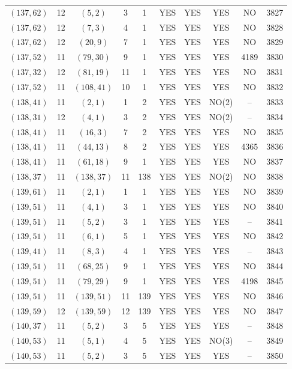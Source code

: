 \begin{longtable}{|c|c|c|c|c|c|c|c|c|c|}
$(137, 62)$ & 12 & $(5, 2)$ & 3 & 1 & YES & YES & YES & NO & 3827\\
$(137, 62)$ & 12 & $(7, 3)$ & 4 & 1 & YES & YES & YES & NO & 3828\\
$(137, 62)$ & 12 & $(20, 9)$ & 7 & 1 & YES & YES & YES & NO & 3829\\
$(137, 52)$ & 11 & $(79, 30)$ & 9 & 1 & YES & YES & YES & 4189 & 3830\\
$(137, 32)$ & 12 & $(81, 19)$ & 11 & 1 & YES & YES & YES & NO & 3831\\
$(137, 52)$ & 11 & $(108, 41)$ & 10 & 1 & YES & YES & YES & NO & 3832\\
$(138, 41)$ & 11 & $(2, 1)$ & 1 & 2 & YES & YES & NO(2) & -- & 3833\\
$(138, 31)$ & 12 & $(4, 1)$ & 3 & 2 & YES & YES & NO(2) & -- & 3834\\
$(138, 41)$ & 11 & $(16, 3)$ & 7 & 2 & YES & YES & YES & NO & 3835\\
$(138, 41)$ & 11 & $(44, 13)$ & 8 & 2 & YES & YES & YES & 4365 & 3836\\
$(138, 41)$ & 11 & $(61, 18)$ & 9 & 1 & YES & YES & YES & NO & 3837\\
$(138, 37)$ & 11 & $(138, 37)$ & 11 & 138 & YES & YES & NO(2) & NO & 3838\\
$(139, 61)$ & 11 & $(2, 1)$ & 1 & 1 & YES & YES & YES & NO & 3839\\
$(139, 51)$ & 11 & $(4, 1)$ & 3 & 1 & YES & YES & YES & NO & 3840\\
$(139, 51)$ & 11 & $(5, 2)$ & 3 & 1 & YES & YES & YES & -- & 3841\\
$(139, 51)$ & 11 & $(6, 1)$ & 5 & 1 & YES & YES & YES & NO & 3842\\
$(139, 41)$ & 11 & $(8, 3)$ & 4 & 1 & YES & YES & YES & -- & 3843\\
$(139, 51)$ & 11 & $(68, 25)$ & 9 & 1 & YES & YES & YES & NO & 3844\\
$(139, 51)$ & 11 & $(79, 29)$ & 9 & 1 & YES & YES & YES & 4198 & 3845\\
$(139, 51)$ & 11 & $(139, 51)$ & 11 & 139 & YES & YES & YES & NO & 3846\\
$(139, 59)$ & 12 & $(139, 59)$ & 12 & 139 & YES & YES & YES & NO & 3847\\
$(140, 37)$ & 11 & $(5, 2)$ & 3 & 5 & YES & YES & YES & -- & 3848\\
$(140, 53)$ & 11 & $(5, 1)$ & 4 & 5 & YES & YES & NO(3) & -- & 3849\\
$(140, 53)$ & 11 & $(5, 2)$ & 3 & 5 & YES & YES & YES & -- & 3850\\

\end{longtable}
